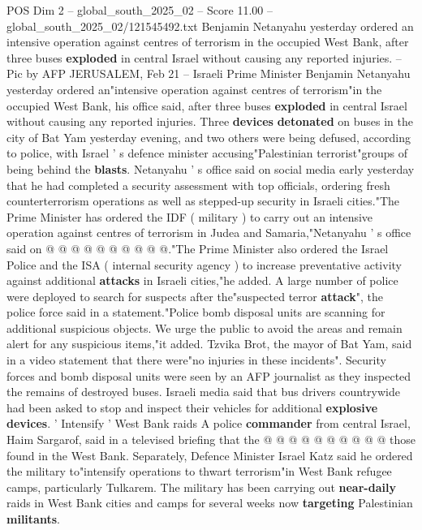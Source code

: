 \begin{textsample}{POS Dim 2 – global\_south\_2025\_02 – Score 11.00 – global\_south\_2025\_02/121545492.txt}  \label{ex:f2_pos_377}
Benjamin Netanyahu yesterday ordered an intensive operation against centres of terrorism in the occupied West Bank, after three buses \textbf{exploded} in central Israel without causing any reported injuries. -- Pic by AFP JERUSALEM, Feb 21 -- Israeli Prime Minister Benjamin Netanyahu yesterday ordered an"intensive operation against centres of terrorism"in the occupied West Bank, his office said, after three buses \textbf{exploded} in central Israel without causing any reported injuries.
Three \textbf{devices} \textbf{detonated} on buses in the city of Bat Yam yesterday evening, and two others were being defused, according to police, with Israel ' s defence minister accusing"Palestinian terrorist"groups of being behind the \textbf{blasts}.
Netanyahu ' s office said on social media early yesterday that he had completed a security assessment with top officials, ordering fresh counterterrorism operations as well as stepped-up security in Israeli cities."The Prime Minister has ordered the IDF ( military ) to carry out an intensive operation against centres of terrorism in Judea and Samaria,"Netanyahu ' s office said on @ @ @ @ @ @ @ @ @ @."The Prime Minister also ordered the Israel Police and the ISA ( internal security agency ) to increase preventative activity against additional \textbf{attacks} in Israeli cities,"he added.
A large number of police were deployed to search for suspects after the"suspected terror \textbf{attack}", the police force said in a statement."Police bomb disposal units are scanning for additional suspicious objects.
We urge the public to avoid the areas and remain alert for any suspicious items,"it added.
Tzvika Brot, the mayor of Bat Yam, said in a video statement that there were"no injuries in these incidents".
Security forces and bomb disposal units were seen by an AFP journalist as they inspected the remains of destroyed buses.
Israeli media said that bus drivers countrywide had been asked to stop and inspect their vehicles for additional \textbf{explosive} \textbf{devices}. ' Intensify ' West Bank raids A police \textbf{commander} from central Israel, Haim Sargarof, said in a televised briefing that the @ @ @ @ @ @ @ @ @ @ those found in the West Bank.
Separately, Defence Minister Israel Katz said he ordered the military to"intensify operations to thwart terrorism"in West Bank refugee camps, particularly Tulkarem.
The military has been carrying out \textbf{near-daily} raids in West Bank cities and camps for several weeks now \textbf{targeting} Palestinian \textbf{militants}.

\end{textsample}
